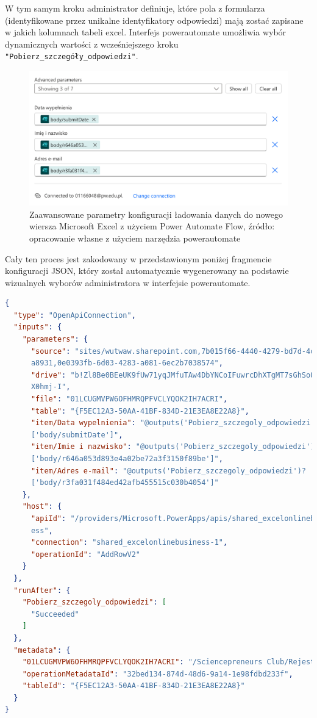 W tym samym kroku administrator definiuje, które pola z formularza (identyfikowane przez unikalne identyfikatory odpowiedzi) mają zostać zapisane w jakich kolumnach tabeli \gls{excel}. Interfejs \gls{powerautomate} umożliwia wybór dynamicznych wartości z wcześniejszego kroku \texttt{"Pobierz\_szczegóły\_odpowiedzi"}.

\newpage
\begin{figure}[!hb]
	\centering \includegraphics[width=0.7\linewidth]{rysunki/DodanieWierszaAdvanced.png}
	\caption{Zaawansowane parametry konfiguracji ładowania danych do nowego wiersza Microsoft Excel z użyciem Power Automate Flow, źródło: opracowanie własne z użyciem narzędzia \gls{powerautomate}}
\end{figure}

Cały ten proces jest zakodowany w przedstawionym poniżej fragmencie konfiguracji JSON, który został automatycznie wygenerowany na podstawie wizualnych wyborów administratora w interfejsie \gls{powerautomate}. 

\begin{lstlisting}[language=json, caption={Konfiguracja przesyłu danych uczestników do Microsoft Excel z użyciem Power Automate w języku JSON źródło: kod wygenerowany na podstwie konfiguracji poprzez narzędzie Power Automate}]
{
  "type": "OpenApiConnection",
  "inputs": {
    "parameters": {
      "source": "sites/wutwaw.sharepoint.com,7b015f66-4440-4279-bd7d-4c3bd72
      a8931,0e0393fb-6d03-4283-a081-6ec2b7038574",
      "drive": "b!Zl8Be0BEeUK9fUw71yqJMfuTAw4DbYNCoIFuwrcDhXTgMT7sGhSoQ5bE7
      X0hmj-I",
      "file": "01LCUGMVPW6OFHMRQPFVCLYQOK2IH7ACRI",
      "table": "{F5EC12A3-50AA-41BF-834D-21E3EA8E22A8}",
      "item/Data wypelnienia": "@outputs('Pobierz_szczegoly_odpowiedzi')?
      ['body/submitDate']",
      "item/Imie i nazwisko": "@outputs('Pobierz_szczegoly_odpowiedzi')?
      ['body/r646a053d893e4a02be72a3f3150f89be']",
      "item/Adres e-mail": "@outputs('Pobierz_szczegoly_odpowiedzi')?
      ['body/r3fa031f484ed42afb455515c030b4054']"
    },
    "host": {
      "apiId": "/providers/Microsoft.PowerApps/apis/shared_excelonlinebusin
      ess",
      "connection": "shared_excelonlinebusiness-1",
      "operationId": "AddRowV2"
    }
  },
  "runAfter": {
    "Pobierz_szczegoly_odpowiedzi": [
      "Succeeded"
    ]
  },
  "metadata": {
    "01LCUGMVPW6OFHMRQPFVCLYQOK2IH7ACRI": "/Sciencepreneurs Club/Rejestracja/SC BAZA.xlsx",
    "operationMetadataId": "32bed134-874d-48d6-9a14-1e98fdbd233f",
    "tableId": "{F5EC12A3-50AA-41BF-834D-21E3EA8E22A8}"
  }
}
\end{lstlisting}

